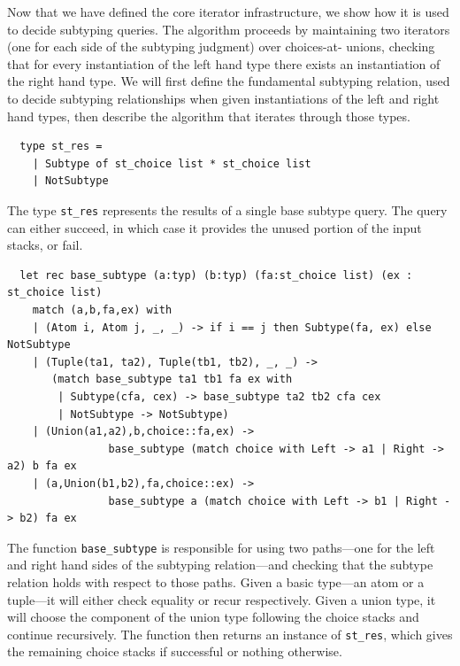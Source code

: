 \documentclass[a4paper,english]{lipics-v2018}
\begin{document}
Now that we have defined the core iterator infrastructure, we show how it
is used to decide subtyping queries. The algorithm proceeds by maintaining two
iterators (one for each side of the subtyping judgment) over choices-at-
unions,  checking that for every instantiation of the left hand type there
exists an instantiation of the right hand type. We will first define the
fundamental subtyping relation, used to decide subtyping relationships when
given instantiations of the left and right hand types, then describe the
algorithm that iterates through those types.

\begin{small}
\begin{verbatim}
  type st_res =
    | Subtype of st_choice list * st_choice list
    | NotSubtype
\end{verbatim}
\end{small}

The type \verb|st_res| represents the results of a single base subtype query. The query
can either succeed, in which case it provides the unused portion of the input
stacks, or fail. 

\begin{small}
\begin{verbatim}
  let rec base_subtype (a:typ) (b:typ) (fa:st_choice list) (ex : st_choice list)
    match (a,b,fa,ex) with
    | (Atom i, Atom j, _, _) -> if i == j then Subtype(fa, ex) else NotSubtype
    | (Tuple(ta1, ta2), Tuple(tb1, tb2), _, _) ->
       (match base_subtype ta1 tb1 fa ex with
        | Subtype(cfa, cex) -> base_subtype ta2 tb2 cfa cex
        | NotSubtype -> NotSubtype)
    | (Union(a1,a2),b,choice::fa,ex) -> 
                base_subtype (match choice with Left -> a1 | Right -> a2) b fa ex
    | (a,Union(b1,b2),fa,choice::ex) -> 
                base_subtype a (match choice with Left -> b1 | Right -> b2) fa ex
\end{verbatim}
\end{small}

The function \verb|base_subtype| is responsible for using two
paths---one for the left and right hand sides of the subtyping
relation---and checking that the subtype relation holds with respect
to those paths. Given a basic type---an atom or a tuple---it will
either check equality or recur respectively. Given a union type, it
will choose the component of the union type following the choice
stacks and continue recursively. The function then returns an instance
of \verb|st_res|, which gives the remaining choice stacks if
successful or nothing otherwise.
\end{document}
